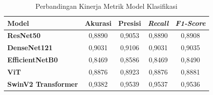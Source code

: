 \begin{table}[H]
	\centering
	\caption{Perbandingan Kinerja Metrik Model Klasifikasi}
	\label{tb:classificationperf}
	
	\vspace{2ex}
	
	\begin{tabularx}{\textwidth}{|X|c|c|c|c|}
		\hline
		\rowcolor[HTML]{C0C0C0}
		\textbf{Model} & \textbf{Akurasi} & \textbf{Presisi} & \textbf{\textit{Recall}} & \textbf{\textit{F1-Score}} \\ \hline
		
		\textbf{ResNet50} & 0,8890 & 0,9053 & 0,8890 & 0,8908 \\ \hline
		\textbf{DenseNet121} & 0,9031 & 0,9106 & 0,9031 & 0,9035 \\ \hline
		\textbf{EfficientNetB0} & 0,8469 & 0,8586 & 0,8469 & 0,8490 \\ \hline
		\textbf{ViT} & 0,8876 & 0,8923 & 0,8876 & 0,8881 \\ \hline
		\textbf{SwinV2 Transformer} & 0,9382 & 0,9539 & 0,9537 & 0,9536 \\ \hline
		
	\end{tabularx}
\end{table}